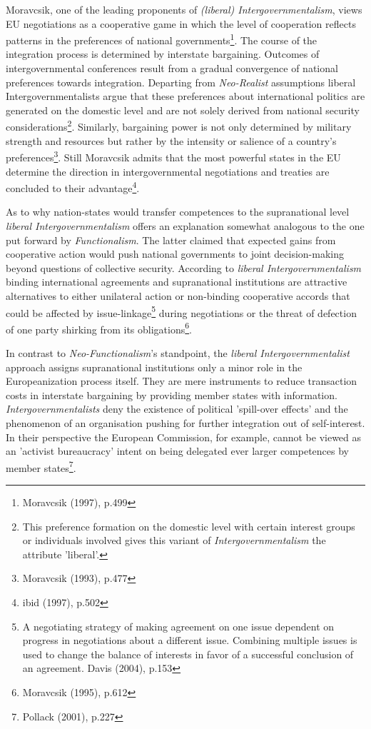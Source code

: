 \documentclass[11pt,a4paper,english]{scrreprt}
\begin{document}
Moravcsik, one of the leading proponents of \emph{(liberal)
Intergovernmentalism}, views EU negotiations as a cooperative game in which the
level of cooperation reflects patterns in the preferences of national
governments\footnote{Moravcsik (1997), p.499}. The course of the integration
process is determined by interstate bargaining. Outcomes of intergovernmental
conferences result from a gradual convergence of national preferences towards
integration. Departing from \emph{Neo-Realist} assumptions liberal
Intergovernmentalists argue that these preferences about international politics
are generated on the domestic level and are not solely derived from national
security considerations\footnote{\textcolor{dunkelgrau.80}{This preference
formation on the domestic level with certain interest groups or individuals
involved gives this variant of \emph{Intergovernmentalism} the attribute
'liberal'.}}. Similarly, bargaining power is not only determined by military
strength and resources but rather by the intensity or salience of a country's
preferences\footnote{Moravcsik (1993), p.477}. Still Moravcsik admits that the
most powerful states in the EU determine the direction in intergovernmental
negotiations and treaties are concluded to their advantage\footnote{ibid
(1997), p.502}.\par

As to why nation-states would transfer competences to the supranational level
\emph{liberal Intergovernmentalism} offers an explanation somewhat analogous to
the one put forward by \emph{Functionalism}. The latter claimed that expected
gains from cooperative action would push national governments to joint
decision-making beyond questions of collective security. According to
\emph{liberal Intergovernmentalism} binding international agreements and
supranational institutions are attractive alternatives to either unilateral
action or non-binding cooperative accords that could be affected by
issue-linkage\footnote{\textcolor{dunkelgrau.80}{A negotiating strategy of
making agreement on one issue dependent on progress in negotiations about a
different issue. Combining multiple issues is used to change the balance of
interests in favor of a successful conclusion of an agreement.
\texttwelveudash{} Davis (2004), p.153}} during negotiations or the threat of
defection of one party shirking from its obligations\footnote{Moravcsik (1995),
p.612}.\par

In contrast to \emph{Neo-Functionalism}'s standpoint, the \emph{liberal
Intergovernmentalist} approach assigns supranational institutions only a minor
role in the Europeanization process itself. They are mere instruments to reduce
transaction costs in interstate bargaining by providing member states with
information. \emph{Intergovernmentalists} deny the existence of political
'spill-over effects' and the phenomenon of an organisation pushing for further
integration out of self-interest. In their perspective the European Commission,
for example, cannot be viewed as an 'activist bureaucracy' intent on being
delegated ever larger competences by member states\footnote{Pollack (2001),
p.227}.
\end{document}
